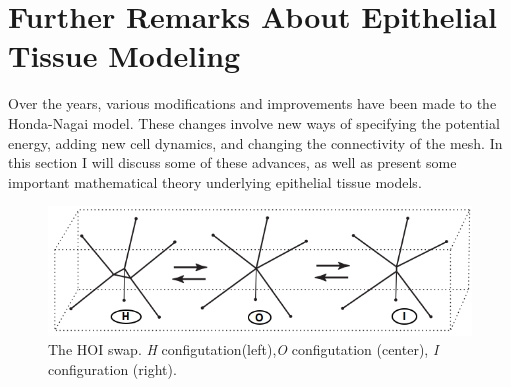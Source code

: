 \section{Further Remarks About Epithelial Tissue Modeling}
Over the years, various modifications and improvements have been made to the Honda-Nagai model. These changes involve new ways of specifying the potential energy, adding new cell dynamics, and changing the connectivity of the mesh. In this section I will discuss some of these advances, as well as present some important mathematical theory underlying epithelial tissue models.


\begin{figure}
\centering
\includegraphics[width=\textwidth]{../diagrams/hoi.png}
\caption[The HOI swap.]{The HOI swap. \emph{H} configutation(left),\emph{O} configutation (center), \emph{I} configuration (right).}
\label{fig:hoi}
\end{figure}

